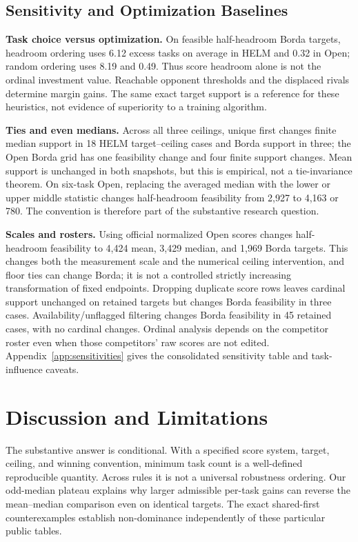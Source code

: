 \documentclass{article}
\begin{document}
\subsection{Sensitivity and Optimization Baselines}
\textbf{Task choice versus optimization.} On feasible half-headroom Borda targets, headroom ordering uses 6.12 excess tasks on average in HELM and 0.32 in Open; random ordering uses 8.19 and 0.49. Thus score headroom alone is not the ordinal investment value. Reachable opponent thresholds and the displaced rivals determine margin gains. The same exact target support is a reference for these heuristics, not evidence of superiority to a training algorithm.

\textbf{Ties and even medians.} Across all three ceilings, unique first changes finite median support in 18 HELM target--ceiling cases and Borda support in three; the Open Borda grid has one feasibility change and four finite support changes. Mean support is unchanged in both snapshots, but this is empirical, not a tie-invariance theorem. On six-task Open, replacing the averaged median with the lower or upper middle statistic changes half-headroom feasibility from 2,927 to 4,163 or 780. The convention is therefore part of the substantive research question.

\textbf{Scales and rosters.} Using official normalized Open scores changes half-headroom feasibility to 4,424 mean, 3,429 median, and 1,969 Borda targets. This changes both the measurement scale and the numerical ceiling intervention, and floor ties can change Borda; it is not a controlled strictly increasing transformation of fixed endpoints. Dropping duplicate score rows leaves cardinal support unchanged on retained targets but changes Borda feasibility in three cases. Availability/unflagged filtering changes Borda feasibility in 45 retained cases, with no cardinal changes. Ordinal analysis depends on the competitor roster even when those competitors' raw scores are not edited. Appendix~\ref{app:sensitivities} gives the consolidated sensitivity table and task-influence caveats.

\section{Discussion and Limitations}
The substantive answer is conditional. With a specified score system, target, ceiling, and winning convention, minimum task count is a well-defined reproducible quantity. Across rules it is not a universal robustness ordering. Our odd-median plateau explains why larger admissible per-task gains can reverse the mean--median comparison even on identical targets. The exact shared-first counterexamples establish non-dominance independently of these particular public tables.
\end{document}
